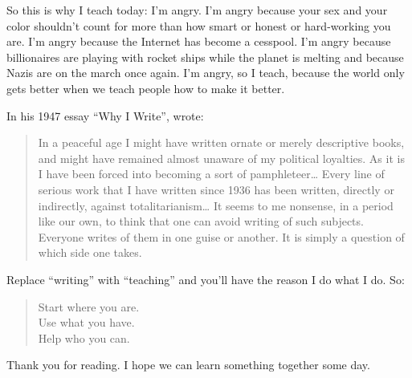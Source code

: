 So this is why I teach today:
I'm angry.
I'm angry because your sex and your color shouldn't count
for more than how smart or honest or hard-working you are.
I'm angry because the Internet has become a cesspool.
I'm angry because billionaires are playing with rocket ships while the planet is melting
and because Nazis are on the march once again.
I'm angry,
so I teach,
because the world only gets better when we teach people how to make it better.

In his 1947 essay ``Why I Write'',
 wrote:

\begin{quote}

  In a peaceful age I might have written ornate or merely descriptive books,
  and might have remained almost unaware of my political loyalties.
  As it is I have been forced into becoming a sort of pamphleteer{\ldots}
  Every line of serious work that I have written since 1936 has been written,
  directly or indirectly,
  against totalitarianism{\ldots}
  It seems to me nonsense,
  in a period like our own,
  to think that one can avoid writing of such subjects.
  Everyone writes of them in one guise or another.
  It is simply a question of which side one takes.

\end{quote}

Replace ``writing'' with ``teaching'' and you'll have the reason I do what I do.
So:

\begin{quote}

Start where you are.\\
Use what you have.\\
Help who you can.

\end{quote}

Thank you for reading.
I hope we can learn something together some day.
